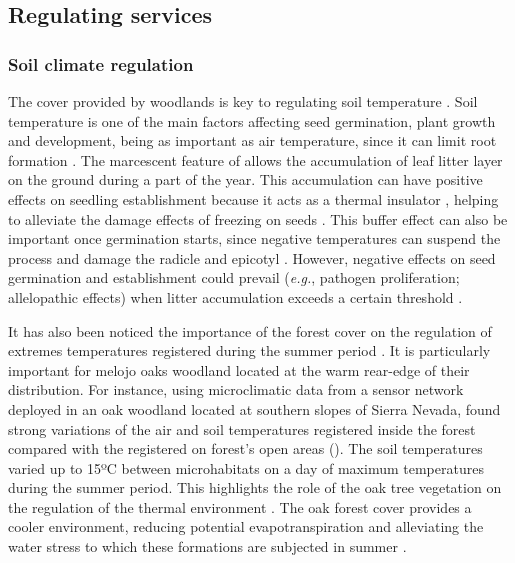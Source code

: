 \subsection{Regulating services}\label{sec:es:regulation}
\subsubsection{Soil climate regulation}\label{sec:es:regulation-soil}

The cover provided by woodlands is key to regulating soil temperature \autocite{Ellisonetal2017TreesForests}. Soil temperature is one of the main factors affecting seed germination, plant growth and development, being as important as air temperature, since it can limit root formation \autocites{AlvarezUriaKorner2007LowTemperature}. The marcescent feature of \Qp allows the accumulation of leaf litter layer on the ground during a part of the year. This accumulation can have positive effects on seedling establishment because it acts as a thermal insulator \autocites{Loydietal2014DistributionEffects}, helping to alleviate the damage effects of freezing on seeds \autocites{Loydietal2014DistributionEffects,CavenderBaresetal2005SummerWinter,EstesoMartinezGilPelegrin2004FrostResistance,Lofetal2019TammReview}. This buffer effect can also be important once germination starts, since negative temperatures can suspend the process and damage the radicle and epicotyl \autocites{AizenWoodcock1996EffectsAcorn}. However, negative effects on seed germination and establishment could prevail (\emph{e.g.}, pathogen proliferation; allelopathic effects) when litter accumulation exceeds a certain threshold \autocites{Loydietal2014DistributionEffects,XiongNilsson1999EffectsPlant}.

It has also been noticed the importance of the forest cover on the regulation of extremes temperatures registered during the summer period \autocites{DeFrenneetal2021ForestMicroclimates}. It is particularly important for melojo oaks woodland located at the warm rear-edge of their distribution. For instance, using microclimatic data from a sensor network deployed in an oak woodland located at southern slopes of Sierra Nevada, \citet{Zamoraetal2021UniendoMacro} found strong variations of the air and soil temperatures registered inside the \Qp forest compared with the registered on forest's open areas (). The soil temperatures varied up to 15ºC between microhabitats on a day of maximum temperatures during the summer period. This highlights the role of the oak tree vegetation on the regulation of the thermal environment \autocites{Niinemets2010ResponsesForest}. The oak forest cover provides a cooler environment, reducing potential evapotranspiration and alleviating the water stress to which these formations are subjected in summer \autocites{Zamoraetal2021UniendoMacro}.  

